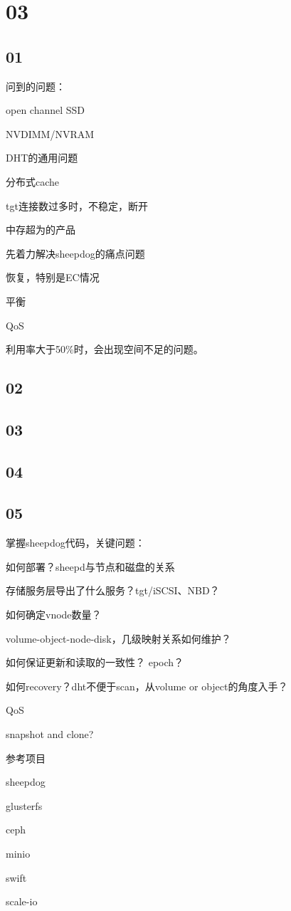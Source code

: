\section{03}

\subsection{01}

问到的问题：
\begin{enumbox}
\item open channel SSD
\item NVDIMM/NVRAM
\item DHT的通用问题
\item 分布式cache
\item tgt连接数过多时，不稳定，断开
\item 中存超为的产品
\end{enumbox}

先着力解决sheepdog的痛点问题
\begin{enumbox}
\item 恢复，特别是EC情况
\item 平衡
\item QoS
\end{enumbox}

利用率大于50\%时，会出现空间不足的问题。

\subsection{02}

\subsection{03}

\subsection{04}

\subsection{05}

掌握sheepdog代码，关键问题：
\begin{enumbox}
\item 如何部署？sheepd与节点和磁盘的关系
\item 存储服务层导出了什么服务？tgt/iSCSI、NBD？
\item 如何确定vnode数量？
\item volume-object-node-disk，几级映射关系如何维护？
\item 如何保证更新和读取的一致性？ epoch？
\item 如何recovery？dht不便于scan，从volume or object的角度入手？
\item QoS
\item snapshot and clone?
\end{enumbox}

参考项目
\begin{enumbox}
\item sheepdog
\item glusterfs
\item ceph
\item minio
\item swift
\item scale-io
\end{enumbox}
